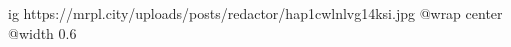  
 
 
 
 

\ifcmt
  ig https://mrpl.city/uploads/posts/redactor/hap1cwlnlvg14ksi.jpg
  @wrap center
  @width 0.6
\fi
